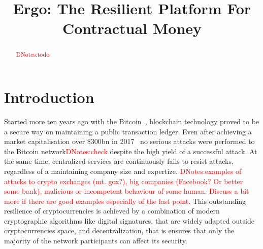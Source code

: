 \documentclass[]{article}
\newcommand{\dnote}[1]{{\textcolor{red}{DNotes:{#1}}}}
\begin{document}
    \title{Ergo: The Resilient Platform For Contractual Money}


    \maketitle

    \begin{abstract}
        \dnote{todo}
    \end{abstract}



    \section{Introduction}


    Started more ten years ago with the Bitcoin~\cite{nakamoto2008bitcoin}, blockchain technology proved to be a secure way on maintaining
    a public transaction ledger.
    Even after achieving a market capitalisation over \$300bn in 2017~\cite{https://cointelegraph.com/news/bitcoins-price-surpasses-18000-level-market-cap-now-higher-than-visas}
    no serious attacks were performed to the Bitcoin network\dnote{check} despite the high yield of a successful attack.
    At the same time, centralized services are continuously fails to resist attacks, regardless of a maintaining company size and expertize.
    \dnote{examples of attacks to crypto exchanges (mt. gox?), big companies (Facebook? Or better some bank), malicious or incompetent behaviour of some human.
    Discuss a bit more if there are good examples especially of the last point}.
    This outstanding resilience of cryptocurrencies is achieved by a combination of modern cryptographic algorithms like digital
    signatures, that are widely adapted outside cryptocurrencies space, and decentralization, that is ensures that only
    the majority of the network participants can affect its security.
\end{document}
